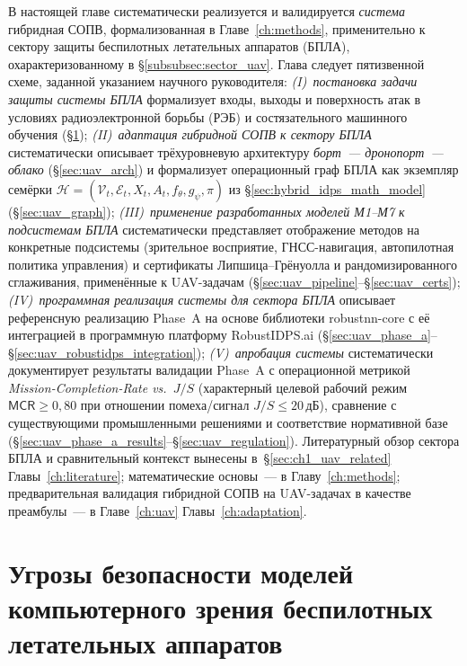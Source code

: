 В настоящей главе систематически реализуется и валидируется
\emph{система} гибридная СОПВ, формализованная в
Главе~\ref{ch:methods}, применительно к сектору защиты беспилотных
летательных аппаратов (БПЛА), охарактеризованному в
\S\ref{subsubsec:sector_uav}. Глава следует пятизвенной схеме,
заданной указанием научного руководителя:
\emph{(I)~постановка задачи защиты системы БПЛА} формализует
входы, выходы и поверхность атак в условиях радиоэлектронной
борьбы (РЭБ) и состязательного машинного обучения
(\S\ref{sec:uav_overview});
\emph{(II)~адаптация гибридной СОПВ к сектору БПЛА}
систематически описывает трёхуровневую архитектуру
\emph{борт~--- дронопорт~--- облако} (\S\ref{sec:uav_arch}) и
формализует операционный граф БПЛА как экземпляр семёрки
$\mathcal{H}=(\mathcal{V}_t, \mathcal{E}_t, X_t, A_t, f_\theta,
g_\psi, \pi)$ из \S\ref{sec:hybrid_idps_math_model}
(\S\ref{sec:uav_graph});
\emph{(III)~применение разработанных моделей М1--М7 к подсистемам
БПЛА} систематически представляет отображение методов на
конкретные подсистемы (зрительное восприятие, ГНСС-навигация,
автопилотная политика управления) и сертификаты
Липшица--Грёнуолла и рандомизированного сглаживания, применённые
к UAV-задачам
(\S\ref{sec:uav_pipeline}--\S\ref{sec:uav_certs});
\emph{(IV)~программная реализация системы для сектора БПЛА}
описывает референсную реализацию Phase~A на основе библиотеки
\textsf{robustnn-core} с её интеграцией в программную платформу
\textsf{RobustIDPS.ai}
(\S\ref{sec:uav_phase_a}--\S\ref{sec:uav_robustidps_integration});
\emph{(V)~апробация системы} систематически документирует
результаты валидации Phase~A с операционной метрикой
\emph{Mission-Completion-Rate vs.~$J/S$} (характерный целевой
рабочий режим $\textsf{MCR}\ge 0{,}80$ при отношении
помеха/сигнал $J/S \le 20\,$дБ), сравнение с существующими
промышленными решениями и соответствие нормативной базе
(\S\ref{sec:uav_phase_a_results}--\S\ref{sec:uav_regulation}).
Литературный обзор сектора БПЛА и сравнительный контекст
вынесены в~\S\ref{sec:ch1_uav_related} Главы~\ref{ch:literature};
математические основы~--- в Главу~\ref{ch:methods};
предварительная валидация гибридной СОПВ на UAV-задачах в
качестве преамбулы~--- в Главе~\ref{ch:uav}
Главы~\ref{ch:adaptation}.

\section{Угрозы безопасности моделей компьютерного зрения беспилотных летательных аппаратов}
\label{sec:uav_overview}

